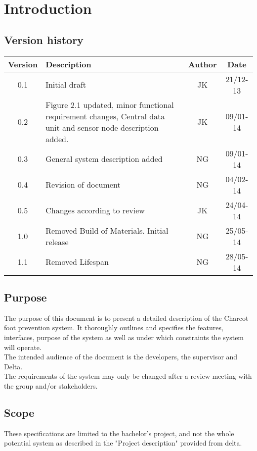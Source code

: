 \chapter{Introduction}
\section{Version history}
\begin{table}[H]
\begin{tabular}{|c|p{9cm}|c|c|}
\hline
Version & Description & Author & Date\\
\hline
0.1 & Initial draft & JK & 21/12-13\\
\hline
0.2 & Figure 2.1 updated, minor functional requirement changes, Central data unit and sensor node description added. & JK & 09/01-14\\
\hline
0.3 & General system description added & NG & 09/01-14\\
\hline
0.4 & Revision of document & NG & 04/02-14\\
\hline
0.5 & Changes according to review & JK & 24/04-14\\
\hline
1.0 & Removed Build of Materials. Initial release & NG & 25/05-14\\
\hline
1.1 & Removed Lifespan & NG & 28/05-14\\ \hline
\end{tabular}
\end{table}

\section{Purpose}
The purpose of this document is to present a detailed description of the Charcot foot prevention system. It thoroughly outlines and specifies the features, interfaces, purpose of the system as well as under which constraints the system will operate.\\
The intended audience of the document is the developers, the supervisor and Delta.\\
The requirements of the system may only be changed after a review meeting with the group and/or stakeholders.\\

\section{Scope}
These specifications are limited to the bachelor's project, and not the whole potential system as described in the "Project description" provided from delta.\\

